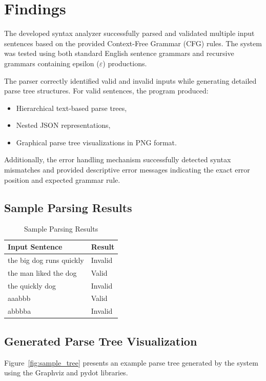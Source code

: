 \documentclass[12pt,a4paper]{article}
\begin{document}
	\section{Findings}
	The developed syntax analyzer successfully parsed and validated multiple input sentences based on the provided Context-Free Grammar (CFG) rules. The system was tested using both standard English sentence grammars and recursive grammars containing epsilon ($\varepsilon$) productions.

The parser correctly identified valid and invalid inputs while generating detailed parse tree structures. For valid sentences, the program produced:
\begin{itemize}
    \item Hierarchical text-based parse trees,
    \item Nested JSON representations,
    \item Graphical parse tree visualizations in PNG format.
\end{itemize}

Additionally, the error handling mechanism successfully detected syntax mismatches and provided descriptive error messages indicating the exact error position and expected grammar rule.

\subsection{Sample Parsing Results}

\begin{table}[H]
\centering
\begin{tabular}{|p{6cm}|p{3cm}|}
\hline
\textbf{Input Sentence} & \textbf{Result} \\
\hline
the big dog runs quickly & Invalid \\
\hline
the man liked the dog & Valid \\
\hline
the quickly dog & Invalid \\
\hline
aaabbb & Valid \\
\hline
abbbba & Invalid \\
\hline
\end{tabular}
\caption{Sample Parsing Results}
\label{tab:results}
\end{table}

\subsection{Generated Parse Tree Visualization}

Figure~\ref{fig:sample_tree} presents an example parse tree generated by the system using the Graphviz and pydot libraries.
\end{document}
